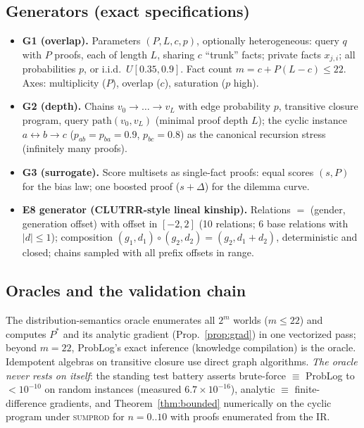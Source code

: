 \documentclass[10pt]{article}
\theoremstyle{remark}
\begin{document}
\subsection{Generators (exact specifications)}\label{sec:generators}

\begin{itemize}[leftmargin=2em]
\item \textbf{G1 (overlap).} Parameters $(P, L, c, p)$, optionally heterogeneous: query $q$ with
$P$ proofs, each of length $L$, sharing $c$ ``trunk'' facts; private facts $x_{j,i}$; all
probabilities $p$, or i.i.d.\ $U[0.35, 0.9]$. Fact count $m = c + P(L-c) \le 22$. Axes:
multiplicity ($P$), overlap ($c$), saturation ($p$ high).
\item \textbf{G2 (depth).} Chains $v_0 \to \dots \to v_L$ with edge probability $p$, transitive
closure program, query $\mathrm{path}(v_0, v_L)$ (minimal proof depth $L$); the cyclic instance $a
\leftrightarrow b \to c$ ($p_{ab}=p_{ba}=0.9$, $p_{bc}=0.8$) as the canonical recursion stress
(infinitely many proofs).
\item \textbf{G3 (surrogate).} Score multisets as single-fact proofs: equal scores $(s, P)$ for
the bias law; one boosted proof ($s + \Delta$) for the dilemma curve.
\item \textbf{E8 generator (CLUTRR-style lineal kinship).} Relations $=$ (gender, generation
offset) with offset in $[-2,2]$ (10 relations; 6 base relations with $\lvert d\rvert\le1$);
composition $(g_1,d_1)\circ(g_2,d_2) = (g_2, d_1{+}d_2)$, deterministic and closed; chains sampled
with all prefix offsets in range.
\end{itemize}

\subsection{Oracles and the validation chain}\label{sec:validation}

The distribution-semantics oracle enumerates all $2^m$ worlds ($m \le 22$) and computes $P^*$ and
its analytic gradient (Prop.~\ref{prop:grad}) in one vectorized pass; beyond $m = 22$, ProbLog's
exact inference (knowledge compilation) is the oracle. Idempotent algebras on transitive closure
use direct graph algorithms. \emph{The oracle never rests on itself}: the standing test battery
asserts brute-force $\equiv$ ProbLog to $<10^{-10}$ on random instances (measured
$6.7\times10^{-16}$), analytic $\equiv$ finite-difference gradients, and
Theorem~\ref{thm:bounded} numerically on the cyclic program under \textsc{sumprod} for $n =
0..10$ with proofs enumerated from the IR.
\end{document}
